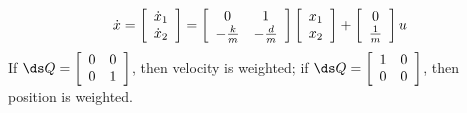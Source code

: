 \begin{enumerate}
\begin{eqnarray*}
\dot x = \left[\begin{array}{c} \dot x_1\\ \dot x_2\end{array}\right] = \left[\begin{array}{cc}0  & 1\\  - \frac km &-\frac d m\end{array}\right] \left [ \begin{array}{c} x_1\\ x_2\end{array}\right]  + \left[\begin{array}c 0 \\ \frac 1m\end{array}\right] u
\end{eqnarray*}
 If $\ds Q = \left[\begin{array}{cc} 0&0\\0&1\end{array}\right]$, then velocity is weighted;  if $\ds Q = \left[\begin{array}{cc} 1&0\\0&0\end{array}\right]$, then position is weighted.
 
 



\end{enumerate}